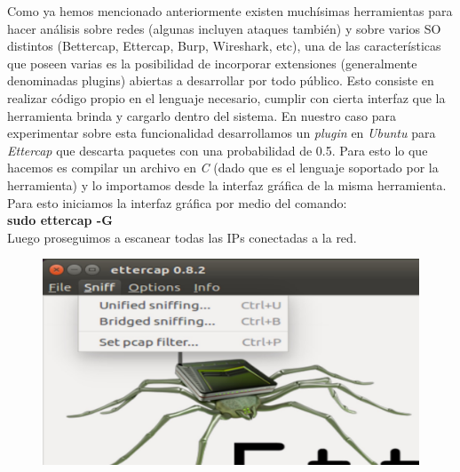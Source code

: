 \documentclass[10pt,a4paper]{article}
\begin{document}
Como ya hemos mencionado anteriormente existen muchísimas herramientas para hacer análisis sobre redes (algunas incluyen ataques también) y sobre varios SO distintos (Bettercap, Ettercap, Burp, Wireshark, etc), una de las características que poseen varias es la posibilidad de incorporar extensiones (generalmente denominadas plugins) abiertas a desarrollar por todo público. Esto consiste en realizar código propio en el lenguaje necesario, cumplir con cierta interfaz que la herramienta brinda y cargarlo dentro del sistema.
En nuestro caso para experimentar sobre esta funcionalidad desarrollamos un \textit{plugin} en \textit{Ubuntu} para \textit{Ettercap} que descarta paquetes con una probabilidad de 0.5.
Para esto lo que hacemos es compilar un archivo en \textit{C} (dado que es el lenguaje soportado por la herramienta) y lo importamos desde la interfaz gráfica de la misma herramienta.
Para esto iniciamos la interfaz gráfica por medio del comando:\\
\textbf{sudo ettercap -G} \\
Luego proseguimos a escanear todas las IPs conectadas a la red.

\begin{figure}[H]
\centerline{\includegraphics[scale=1]{images/ettercap_1.jpg}}
\caption{}
\end{figure}
\end{document}
